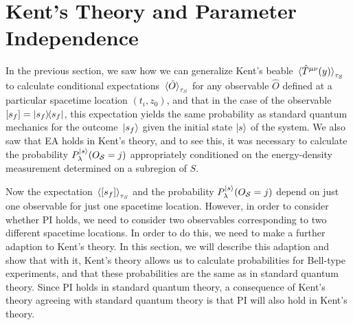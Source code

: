\section{Kent's Theory and Parameter Independence\label{kentpi}}
  In the previous section, we saw how we can generalize Kent's beable $\ev*{\hat{T}^{\mu\nu}(y)}_{\tau_S}$ to calculate conditional expectations $\ev*{\hat{O}}_{\tau_S}$ for any observable $\hat{O}$ defined at a particular spacetime location $(t_i, z_0)$, and that in the case of the observable $[s_f]=\dyad{s_f}$, this expectation yields the same probability as standard quantum mechanics for the outcome $\ket*{s_f}$ given the initial state $\ket{s}$ of the system.  We also saw that  EA holds in Kent's theory, and to see this, it was necessary to calculate the probability $P_\lambda^{\ket{s}}(O_{\mathcal{S}}=j)$ appropriately conditioned on the energy-density measurement determined on a subregion of $S$. 
  
  Now the expectation  $\ev*{[s_f]}_{\tau_S}$ and the probability $P_\lambda^{\ket{s}}(O_{\mathcal{S}}=j)$ depend on just one observable for just one spacetime location. However, in order to consider whether PI holds, we need to consider two observables corresponding to two different spacetime locations. In order to do this, we need to make a further adaption to Kent's theory. In this section, we will describe this adaption and show that with it, Kent's theory allows us to calculate probabilities for Bell-type experiments, and that these probabilities are the same as in standard quantum theory. Since PI holds in standard quantum theory,  a consequence of Kent's theory agreeing with standard quantum theory is that PI will also hold in Kent's theory.


